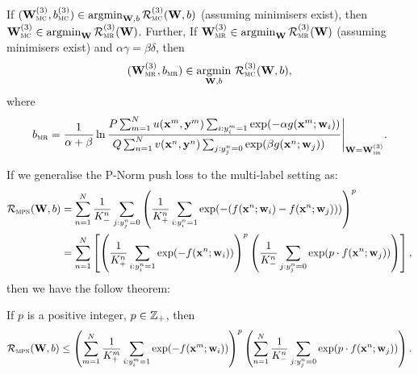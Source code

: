 \begin{theorem}
\label{theorem:mc2mr}
If $(\mathbf{W}_\textsc{mc}^{({3})}, b_\textsc{mc}^{({3})}) \in \operatorname*{argmin}_{\mathbf{W},b} \mathcal{R}_\textsc{mc}^{({3})}(\mathbf{W}, b)$ (assuming minimisers exist),
then $\mathbf{W}_\textsc{mc}^{({3})} \in \operatorname*{argmin}_{\mathbf{W}} \mathcal{R}_\textsc{mr}^{({3})}(\mathbf{W})$.
Further, If $\mathbf{W}_\textsc{mr}^{({3})} \in \operatorname*{argmin}_{\mathbf{W}} \mathcal{R}_\textsc{mr}^{({3})}(\mathbf{W})$ (assuming minimisers exist) and $\alpha \gamma = \beta \delta$,
then 
$$
(\mathbf{W}_\textsc{mr}^{({3})}, b_\textsc{mr}) \in \operatorname*{argmin}_{\mathbf{W},b} \, \mathcal{R}_\textsc{mc}^{({3})}(\mathbf{W}, b),
$$ 
where
\begin{equation*}
\displaystyle
b_\textsc{mr} = \frac{1}{\alpha + \beta} \ln 
      \frac{P \sum_{m=1}^N u(\mathbf{x}^m, \mathbf{y}^m) \sum_{i: y_i^m = 1} \exp(-\alpha g(\mathbf{x}^m; \mathbf{w}_i))}
           {Q \sum_{n=1}^N v(\mathbf{x}^n, \mathbf{y}^n) \sum_{j: y_j^n = 0} \exp( \beta  g(\mathbf{x}^n; \mathbf{w}_j)) \hspace{1em}} \Bigg|_{\mathbf{W} = \mathbf{W}_\textsc{mr}^{({3})}}.
\end{equation*}
\end{theorem}


If we generalise the P-Norm push loss to the multi-label setting as:
\begin{equation}
\label{eq:pnorm-ml}
\displaystyle
\begin{aligned}
\mathcal{R}_\textsc{mpn}(\mathbf{W}, b) 
&= \sum_{n=1}^N \frac{1}{K_-^n} \sum_{j:y_j^n=0} \left( \frac{1}{K_+^n} \sum_{i:y_i^n=1} \exp(-(f(\mathbf{x}^n; \mathbf{w}_i) - f(\mathbf{x}^n; \mathbf{w}_j))) \right)^p \\
&= \sum_{n=1}^N \left[
   \left( \frac{1}{K_+^n} \sum_{i:y_i^n=1} \exp(-f(\mathbf{x}^n; \mathbf{w}_i)) \right)^p 
   \left( \frac{1}{K_-^n} \sum_{j:y_j^n=0} \exp(p \cdot f(\mathbf{x}^n; \mathbf{w}_j)) \right) \right],
\end{aligned}
\end{equation}
then we have the follow theorem:
\begin{theorem}
\label{theorem:pnorm-ml-ub}
If $p$ is a positive integer, \ie $p \in \mathbb{Z}_+$, then 
\begin{equation}
\label{eq:pnorm-ml-ub}
\displaystyle
\mathcal{R}_\textsc{mpn}(\mathbf{W}, b) \le 
\left( \sum_{m=1}^N \frac{1}{K_+^m} \sum_{i:y_i^m=1} \exp(-f(\mathbf{x}^m; \mathbf{w}_i)) \right)^p 
\left( \sum_{n=1}^N \frac{1}{K_-^n} \sum_{j:y_j^n=0} \exp(p \cdot f(\mathbf{x}^n; \mathbf{w}_j)) \right).
\end{equation}
\end{theorem}
